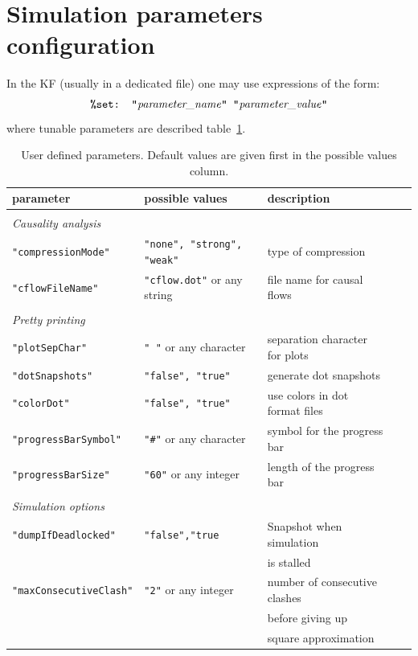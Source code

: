 \documentclass[11pt]{book}
\def\ttt#1{\texttt{#1}}
\begin{document}
\section{Simulation parameters configuration}\label{sec:param}
In the KF (usually in a dedicated file) one may use expressions of the form:
\[
\hbox{\ttt{\%set: "}\textit{parameter\_name}\ttt{" "}\textit{parameter\_value}\ttt{"}}
\]
where tunable parameters are described table~\ref{tab:parameters}.
\begin{table}[ht]
\begin{tabular}{l|l|lll}
parameter & possible values & description \\
\hline &\\
\textit{Causality analysis}&\\
\ttt{"compressionMode"} & \ttt{"none", "strong", "weak"} & \small type of compression \\
\ttt{"cflowFileName"} & \ttt{"cflow.dot"} or any string & \small file name for causal flows\\ & \\
\textit{Pretty printing}&\\
\ttt{"plotSepChar"} & \ttt{" "} or any character & \small separation character for plots\\
\ttt{"dotSnapshots"} & \ttt{"false", "true"} & \small generate dot snapshots\\
\ttt{"colorDot"} &  \ttt{"false", "true"} & \small use colors in dot format files\\
\ttt{"progressBarSymbol"} & \ttt{"\#"} or any character & \small symbol for the progress bar\\
\ttt{"progressBarSize"} & \ttt{"60"} or any integer & \small length of the progress bar\\ &&\\
\textit{Simulation options} &\\
\ttt{"dumpIfDeadlocked"} & \ttt{"false","true} & \small Snapshot when simulation \\&&\small is stalled\\
\ttt{"maxConsecutiveClash"} & \ttt{"2"} or any integer & \small number of consecutive clashes \\ && \small before giving up \\ && \small square approximation\\

\end{tabular}\caption{User defined parameters. Default values are given first in the possible values column.}\label{tab:parameters}
\end{table}
\end{document}
